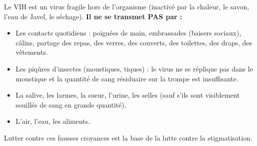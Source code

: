 \documentclass[11pt]{article}
\begin{document}
\begin{attention}
Le VIH est un virus fragile hors de l'organisme (inactivé par la chaleur, le savon, l'eau de Javel, le séchage). \textbf{Il ne se transmet PAS par :}
\begin{itemize}
    \item Les contacts quotidiens : poignées de main, embrassades (baisers sociaux), câlins, partage des repas, des verres, des couverts, des toilettes, des draps, des vêtements.
    \item Les piqûres d'insectes (moustiques, tiques) : le virus ne se réplique pas dans le moustique et la quantité de sang résiduaire sur la trompe est insuffisante.
    \item La salive, les larmes, la sueur, l'urine, les selles (sauf s'ils sont visiblement souillés de sang en grande quantité).
    \item L'air, l'eau, les aliments.
\end{itemize}
Lutter contre ces fausses croyances est la base de la lutte contre la stigmatisation.
\end{attention}
\end{document}

